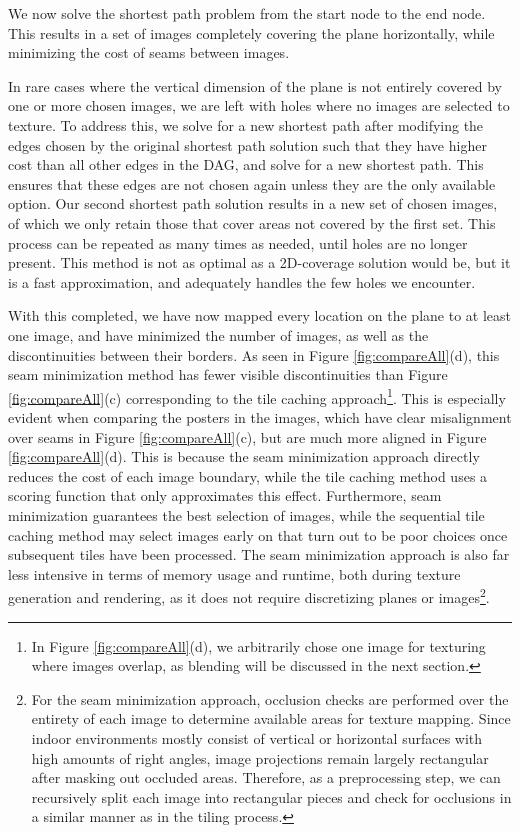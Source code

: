 \documentclass[10pt,twocolumn,letterpaper]{article}
\begin{document}
We now solve the shortest path problem from the start node to the end
node. This results in a set of images completely covering the plane
horizontally, while minimizing the cost of seams between images.

In rare cases where the vertical dimension of the plane is not
entirely covered by one or more chosen images, we are left with holes
where no images are selected to texture. To address this, we solve for
a new shortest path after modifying the edges chosen by the original
shortest path solution such that they have higher cost than all other
edges in the DAG, and solve for a new shortest path. This ensures that
these edges are not chosen again unless they are the only available
option. Our second shortest path solution results in a new set of
chosen images, of which we only retain those that cover areas not
covered by the first set. This process can be repeated as many times
as needed, until holes are no longer present. This method is not as
optimal as a 2D-coverage solution would be, but it is a fast
approximation, and adequately handles the few holes we encounter.

With this completed, we have now mapped every location on the plane to
at least one image, and have minimized the number of images, as well
as the discontinuities between their borders. As seen in Figure
\ref{fig:compareAll}(d), this seam minimization method has fewer
visible discontinuities than Figure \ref{fig:compareAll}(c)
corresponding to the tile caching approach\footnote{In Figure
  \ref{fig:compareAll}(d), we arbitrarily chose one image for
  texturing where images overlap, as blending will be discussed in the
  next section.}. This is especially evident when comparing the
posters in the images, which have clear misalignment over seams in
Figure \ref{fig:compareAll}(c), but are much more aligned in Figure
\ref{fig:compareAll}(d). This is because the seam minimization
approach directly reduces the cost of each image boundary, while the
tile caching method uses a scoring function that only approximates
this effect. Furthermore, seam minimization guarantees the best
selection of images, while the sequential tile caching method may
select images early on that turn out to be poor choices once
subsequent tiles have been processed. The seam minimization approach
is also far less intensive in terms of memory usage and runtime, both
during texture generation and rendering, as it does not require
discretizing planes or images\footnote {For the seam minimization
  approach, occlusion checks are performed over the entirety of each
  image to determine available areas for texture mapping. Since indoor
  environments mostly consist of vertical or horizontal surfaces with
  high amounts of right angles, image projections remain largely
  rectangular after masking out occluded areas. Therefore, as a
  preprocessing step, we can recursively split each image into
  rectangular pieces and check for occlusions in a similar manner as
  in the tiling process.  }.
\end{document}

